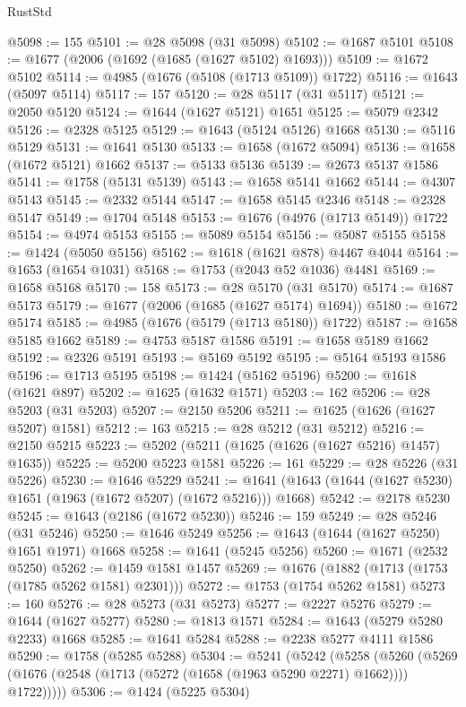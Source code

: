 \begin{lexlean}{RustStd}
\begin{coremodule}
@5098 := 155
@5101 := @28 @5098 (@31 @5098)
@5102 := @1687 @5101
@5108 := @1677 (@2006 (@1692 (@1685 (@1627 @5102) @1693)))
@5109 := @1672 @5102
@5114 := @4985 (@1676 (@5108 (@1713 @5109)) @1722)
@5116 := @1643 (@5097 @5114)
@5117 := 157
@5120 := @28 @5117 (@31 @5117)
@5121 := @2050 @5120
@5124 := @1644 (@1627 @5121) @1651
@5125 := @5079 @2342
@5126 := @2328 @5125
@5129 := @1643 (@5124 @5126) @1668
@5130 := @5116 @5129
@5131 := @1641 @5130
@5133 := @1658 (@1672 @5094)
@5136 := @1658 (@1672 @5121) @1662
@5137 := @5133 @5136
@5139 := @2673 @5137 @1586
@5141 := @1758 (@5131 @5139)
@5143 := @1658 @5141 @1662
@5144 := @4307 @5143
@5145 := @2332 @5144
@5147 := @1658 @5145 @2346
@5148 := @2328 @5147
@5149 := @1704 @5148
@5153 := @1676 (@4976 (@1713 @5149)) @1722
@5154 := @4974 @5153
@5155 := @5089 @5154
@5156 := @5087 @5155
@5158 := @1424 (@5050 @5156)
@5162 := @1618 (@1621 @878) @4467 @4044
@5164 := @1653 (@1654 @1031)
@5168 := @1753 (@2043 @52 @1036) @4481
@5169 := @1658 @5168
@5170 := 158
@5173 := @28 @5170 (@31 @5170)
@5174 := @1687 @5173
@5179 := @1677 (@2006 (@1685 (@1627 @5174) @1694))
@5180 := @1672 @5174
@5185 := @4985 (@1676 (@5179 (@1713 @5180)) @1722)
@5187 := @1658 @5185 @1662
@5189 := @4753 @5187 @1586
@5191 := @1658 @5189 @1662
@5192 := @2326 @5191
@5193 := @5169 @5192
@5195 := @5164 @5193 @1586
@5196 := @1713 @5195
@5198 := @1424 (@5162 @5196)
@5200 := @1618 (@1621 @897)
@5202 := @1625 (@1632 @1571)
@5203 := 162
@5206 := @28 @5203 (@31 @5203)
@5207 := @2150 @5206
@5211 := @1625 (@1626 (@1627 @5207) @1581)
@5212 := 163
@5215 := @28 @5212 (@31 @5212)
@5216 := @2150 @5215
@5223 := @5202 (@5211 (@1625 (@1626 (@1627 @5216) @1457) @1635))
@5225 := @5200 @5223 @1581
@5226 := 161
@5229 := @28 @5226 (@31 @5226)
@5230 := @1646 @5229
@5241 := @1641 (@1643 (@1644 (@1627 @5230) @1651 (@1963 (@1672 @5207) (@1672 @5216))) @1668)
@5242 := @2178 @5230
@5245 := @1643 (@2186 (@1672 @5230))
@5246 := 159
@5249 := @28 @5246 (@31 @5246)
@5250 := @1646 @5249
@5256 := @1643 (@1644 (@1627 @5250) @1651 @1971) @1668
@5258 := @1641 (@5245 @5256)
@5260 := @1671 (@2532 @5250)
@5262 := @1459 @1581 @1457
@5269 := @1676 (@1882 (@1713 (@1753 (@1785 @5262 @1581) @2301)))
@5272 := @1753 (@1754 @5262 @1581)
@5273 := 160
@5276 := @28 @5273 (@31 @5273)
@5277 := @2227 @5276
@5279 := @1644 (@1627 @5277)
@5280 := @1813 @1571
@5284 := @1643 (@5279 @5280 @2233) @1668
@5285 := @1641 @5284
@5288 := @2238 @5277 @4111 @1586
@5290 := @1758 (@5285 @5288)
@5304 := @5241
    (@5242
      (@5258
        (@5260 (@5269 (@1676 (@2548 (@1713 (@5272 (@1658 (@1963 @5290 @2271) @1662)))) @1722)))))
@5306 := @1424 (@5225 @5304)

\end{coremodule}
\end{lexlean}
